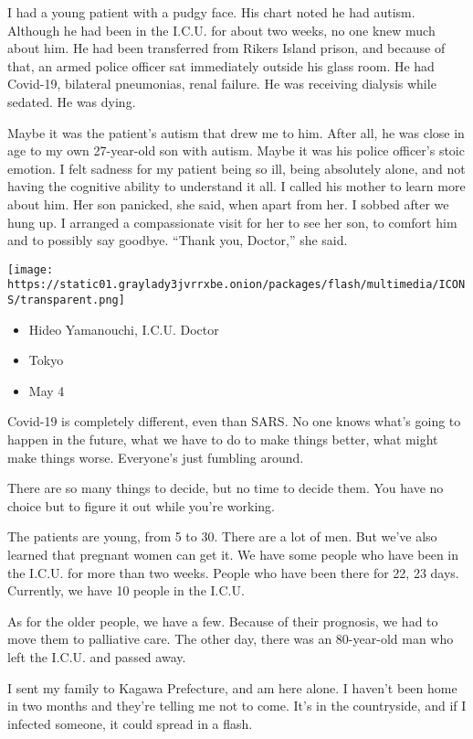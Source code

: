 I had a young patient with a pudgy face. His chart noted he had autism.
Although he had been in the I.C.U. for about two weeks, no one knew much
about him. He had been transferred from Rikers Island prison, and
because of that, an armed police officer sat immediately outside his
glass room. He had Covid-19, bilateral pneumonias, renal failure. He was
receiving dialysis while sedated. He was dying.

Maybe it was the patient's autism that drew me to him. After all, he was
close in age to my own 27-year-old son with autism. Maybe it was his
police officer's stoic emotion. I felt sadness for my patient being so
ill, being absolutely alone, and not having the cognitive ability to
understand it all. I called his mother to learn more about him. Her son
panicked, she said, when apart from her. I sobbed after we hung up. I
arranged a compassionate visit for her to see her son, to comfort him
and to possibly say goodbye. ``Thank you, Doctor,'' she said.

\texttt{[image: https://static01.graylady3jvrrxbe.onion/packages/flash/multimedia/ICONS/transparent.png]}

\begin{itemize}
\tightlist
\item
  Hideo Yamanouchi, I.C.U. Doctor
\item
  Tokyo
\item
  May 4
\end{itemize}

Covid-19 is completely different, even than SARS. No one knows what's
going to happen in the future, what we have to do to make things better,
what might make things worse. Everyone's just fumbling around.

There are so many things to decide, but no time to decide them. You have
no choice but to figure it out while you're working.

The patients are young, from 5 to 30. There are a lot of men. But we've
also learned that pregnant women can get it. We have some people who
have been in the I.C.U. for more than two weeks. People who have been
there for 22, 23 days. Currently, we have 10 people in the I.C.U.

As for the older people, we have a few. Because of their prognosis, we
had to move them to palliative care. The other day, there was an
80-year-old man who left the I.C.U. and passed away.

I sent my family to Kagawa Prefecture, and am here alone. I haven't been
home in two months and they're telling me not to come. It's in the
countryside, and if I infected someone, it could spread in a flash.


